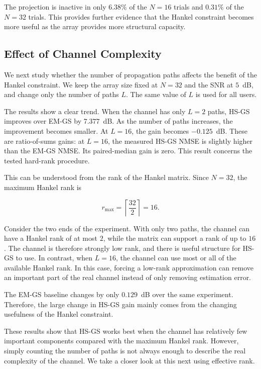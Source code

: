 \documentclass[journal]{IEEEtran}
\begin{document}
The projection is inactive in only $6.38\%$ of the $N=16$ trials and
$0.31\%$ of the $N=32$ trials. This provides further evidence that the
Hankel constraint becomes more useful as the array provides more structural
capacity.

\subsection{Effect of Channel Complexity}
\label{sec:pathcount}

We next study whether the number of propagation paths affects the benefit
of the Hankel constraint. We keep the array size fixed at $N=32$ and the
SNR at $5$~dB, and change only the number of paths $L$. The same value of
$L$ is used for all users.

The results show a clear trend. When the channel has only $L=2$ paths,
HS-GS improves over EM-GS by $7.377$~dB. As the number of paths increases,
the improvement becomes smaller. At $L=16$, the gain becomes
$-0.125$~dB. These are ratio-of-sums gains: at $L=16$, the measured
HS-GS NMSE is slightly higher than the EM-GS NMSE. Its paired-median
gain is zero. This result concerns the tested hard-rank procedure.

This can be understood from the rank of the Hankel matrix. Since $N=32$,
the maximum Hankel rank is

\begin{equation}
r_{\max}
=
\left\lceil
\frac{32}{2}
\right\rceil
=
16.
\end{equation}

Consider the two ends of the experiment. With only two paths, the channel
can have a Hankel rank of at most $2$, while the matrix can support a rank
of up to $16$. The channel is therefore strongly low rank, and there is
useful structure for HS-GS to use. In contrast, when $L=16$, the channel
can use most or all of the available Hankel rank. In this case, forcing a
low-rank approximation can remove an important part of the real channel
instead of only removing estimation error.

The EM-GS baseline changes by only $0.129$~dB over the same experiment.
Therefore, the large change in HS-GS gain mainly comes from the changing
usefulness of the Hankel constraint.

These results show that HS-GS works best when the channel
has relatively few important components compared with the maximum Hankel
rank. However, simply counting the number of paths is not always enough to
describe the real complexity of the channel. We take a closer look at this
next using effective rank.
\end{document}
